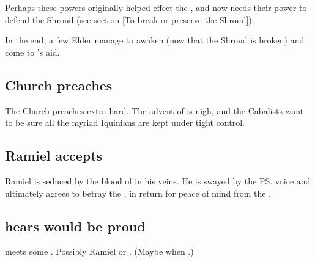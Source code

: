 Perhaps these powers originally helped effect the , and now \Ishnaruchaefir{} needs their power to defend the Shroud (see section \ref{To break or preserve the Shroud}).

In the end, a few Elder \Dragons manage to awaken (now that the Shroud is broken) and come to \Ishnaruchaefir's aid.









\subsection{\Iquinian Church preaches}
The \Iquinian Church preaches extra hard. 
The advent of \Lithrim{} is nigh, and the Cabalists want to be sure all the myriad Iquinians are kept under tight control. 








\subsection{Ramiel accepts \NexagglachelsCurse}
Ramiel is seduced by the blood of \Nexagglachel{} in his veins. 
He is swayed by the \ps{\dragonlord} voice and ultimately agrees to betray the \banelords, in return for peace of mind from the .








\subsection{\Ishnaruchaefir hears \Nexagglachel would be proud}
\Ishnaruchaefir{} meets some \sathariah. 
Possibly Ramiel or \Azraid. 
(Maybe when .) 

